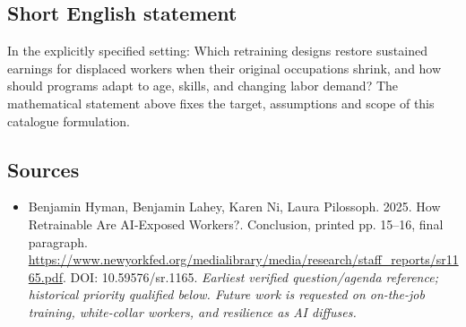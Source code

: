 \documentclass[11pt]{article}
\begin{document}
\subsection{Short English statement}
In the explicitly specified setting: Which retraining designs restore sustained earnings for displaced workers when their original occupations shrink, and how should programs adapt to age, skills, and changing labor demand? The mathematical statement above fixes the target, assumptions and scope of this catalogue formulation.

\subsection{Sources}
\begin{itemize}\raggedright
\item[\textnormal{[S1]}]\hypertarget{source:30007635:1}{} Benjamin Hyman, Benjamin Lahey, Karen Ni, Laura Pilossoph. 2025. How Retrainable Are AI-Exposed Workers?. Conclusion, printed pp. 15–16, final paragraph.
\url{https://www.newyorkfed.org/medialibrary/media/research/staff_reports/sr1165.pdf}.
DOI: 10.59576/sr.1165.
{\small\textit{Earliest verified question/agenda reference; historical priority qualified below. Future work is requested on on-the-job training, white-collar workers, and resilience as AI diffuses.}}
\end{itemize}
\end{document}

